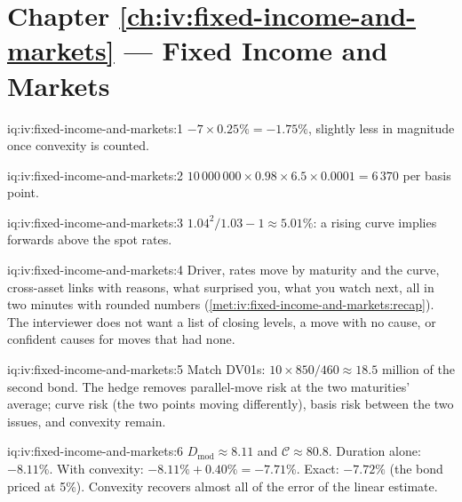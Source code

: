\section*{Chapter \ref{ch:iv:fixed-income-and-markets} --- Fixed Income and Markets}

\begin{solution}{iq:iv:fixed-income-and-markets:1}
$-7 \times 0.25\% = -1.75\%$, slightly less in magnitude once convexity is counted.
\end{solution}

\begin{solution}{iq:iv:fixed-income-and-markets:2}
$10\,000\,000 \times 0.98 \times 6.5 \times 0.0001 = 6\,370$ per basis point.
\end{solution}

\begin{solution}{iq:iv:fixed-income-and-markets:3}
$1.04^2/1.03 - 1 \approx 5.01\%$: a rising curve implies forwards above the spot rates.
\end{solution}

\begin{solution}{iq:iv:fixed-income-and-markets:4}
Driver, rates move by maturity and the curve, cross-asset links with reasons, what surprised you, what you watch next, all in
two minutes with rounded numbers (\cref{met:iv:fixed-income-and-markets:recap}). The interviewer does not want a list of closing
levels, a move with no cause, or confident causes for moves that had none.
\end{solution}

\begin{solution}{iq:iv:fixed-income-and-markets:5}
Match DV01s: $10 \times 850/460 \approx 18.5$ million of the second bond. The hedge removes parallel-move risk at the two
maturities' average; curve risk (the two points moving differently), basis risk between the two issues, and convexity remain.
\end{solution}

\begin{solution}{iq:iv:fixed-income-and-markets:6}
$D_{\mathrm{mod}} \approx 8.11$ and $\mathcal C \approx 80.8$. Duration alone: $-8.11\%$. With convexity: $-8.11\% + 0.40\% =
-7.71\%$. Exact: $-7.72\%$ (the bond priced at 5\%). Convexity recovers almost all of the error of the linear estimate.
\end{solution}

